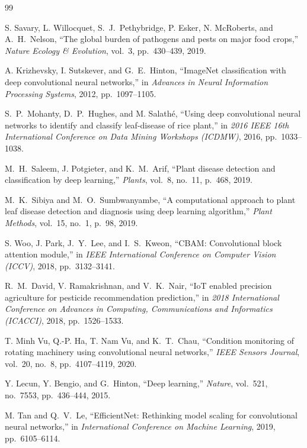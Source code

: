 \documentclass[conference]{IEEEtran}
\begin{document}
\begin{thebibliography}{99}

 S. Savary, L. Willocquet, S.\ J.\ Pethybridge, P. Esker, N. McRoberts, and A.\ H.\ Nelson, ``The global burden of pathogens and pests on major food crops,'' \textit{Nature Ecology \& Evolution}, vol.\ 3, pp.\ 430--439, 2019.

 A. Krizhevsky, I. Sutskever, and G.\ E.\ Hinton, ``ImageNet classification with deep convolutional neural networks,'' in \textit{Advances in Neural Information Processing Systems}, 2012, pp.\ 1097--1105.

 S.\ P.\ Mohanty, D.\ P.\ Hughes, and M. Salathé, ``Using deep convolutional neural networks to identify and classify leaf-disease of rice plant,'' in \textit{2016 IEEE 16th International Conference on Data Mining Workshops (ICDMW)}, 2016, pp.\ 1033--1038.

 M.\ H.\ Saleem, J. Potgieter, and K.\ M.\ Arif, ``Plant disease detection and classification by deep learning,'' \textit{Plants}, vol.\ 8, no.\ 11, p.\ 468, 2019.

 M.\ K.\ Sibiya and M.\ O.\ Sumbwanyambe, ``A computational approach to plant leaf disease detection and diagnosis using deep learning algorithm,'' \textit{Plant Methods}, vol.\ 15, no.\ 1, p.\ 98, 2019.

 S. Woo, J. Park, J.\ Y.\ Lee, and I.\ S.\ Kweon, ``CBAM: Convolutional block attention module,'' in \textit{IEEE International Conference on Computer Vision (ICCV)}, 2018, pp.\ 3132--3141.

 R.\ M.\ David, V. Ramakrishnan, and V.\ K.\ Nair, ``IoT enabled precision agriculture for pesticide recommendation prediction,'' in \textit{2018 International Conference on Advances in Computing, Communications and Informatics (ICACCI)}, 2018, pp.\ 1526--1533.

 T. Minh Vu, Q.-P. Ha, T. Nam Vu, and K.\ T.\ Chau, ``Condition monitoring of rotating machinery using convolutional neural networks,'' \textit{IEEE Sensors Journal}, vol.\ 20, no.\ 8, pp.\ 4107--4119, 2020.

 Y. Lecun, Y. Bengio, and G.\ Hinton, ``Deep learning,'' \textit{Nature}, vol.\ 521, no.\ 7553, pp.\ 436--444, 2015.

 M. Tan and Q.\ V.\ Le, ``EfficientNet: Rethinking model scaling for convolutional neural networks,'' in \textit{International Conference on Machine Learning}, 2019, pp.\ 6105--6114.

\end{thebibliography}
\end{document}
